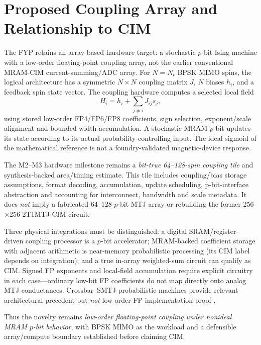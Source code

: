 \documentclass[11pt,a4paper]{article}
\begin{document}
\section{Proposed Coupling Array and Relationship to CIM}
The FYP retains an array-based hardware target: a stochastic $p$-bit Ising machine with a low-order floating-point coupling array, not the earlier conventional MRAM-CIM current-summing/ADC array. For $N=N_t$ BPSK MIMO spins, the logical architecture has a symmetric $N\times N$ coupling matrix $J$, $N$ biases $h_i$, and a feedback spin state vector. The coupling hardware computes a selected local field
\begin{equation}
H_i=h_i+\sum_{j\ne i}J_{ij}s_j,
\end{equation}
using stored low-order FP4/FP6/FP8 coefficients, sign selection, exponent/scale alignment and bounded-width accumulation. A stochastic MRAM $p$-bit updates its state according to its actual probability-controlling input. The ideal sigmoid of the mathematical reference is not a foundry-validated magnetic-device response.

The M2--M3 hardware milestone remains a \emph{bit-true 64--128-spin coupling tile} and synthesis-backed area/timing estimate. This tile includes coupling/bias storage assumptions, format decoding, accumulation, update scheduling, p-bit-interface abstraction and accounting for interconnect, bandwidth and scale metadata. It does \emph{not} imply a fabricated 64--128-$p$-bit MTJ array or rebuilding the former 256$\times$256 2T1MTJ-CIM circuit.

Three physical integrations must be distinguished: a digital SRAM/register-driven coupling processor is a $p$-bit accelerator; MRAM-backed coefficient storage with adjacent arithmetic is near-memory probabilistic processing (its CIM label depends on integration); and a true in-array weighted-sum circuit can qualify as CIM. Signed FP exponents and local-field accumulation require explicit circuitry in each case---ordinary low-bit FP coefficients do not map directly onto analog MTJ conductances. Crossbar--SMTJ probabilistic machines provide relevant architectural precedent but \emph{not} low-order-FP implementation proof \cite{hybrid2026,vcma2024}.

Thus the novelty remains \emph{low-order floating-point coupling under nonideal MRAM $p$-bit behavior}, with BPSK MIMO as the workload and a defensible array/compute boundary established before claiming CIM.
\end{document}
